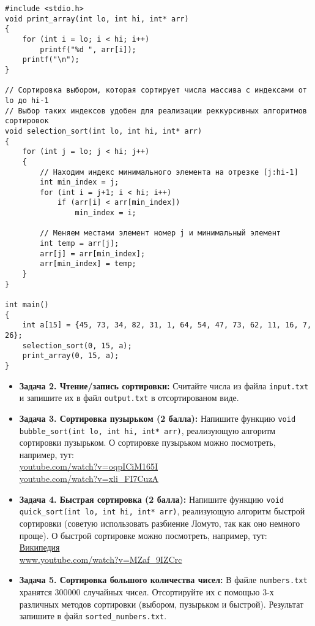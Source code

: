 \documentclass{article}
\begin{document}
\begin{lstlisting}
#include <stdio.h>
void print_array(int lo, int hi, int* arr)
{
	for (int i = lo; i < hi; i++)
		printf("%d ", arr[i]);
	printf("\n");	
}

// Сортировка выбором, которая сортирует числа массива с индексами от lo до hi-1
// Выбор таких индексов удобен для реализации реккурсивных алгоритмов сортировок
void selection_sort(int lo, int hi, int* arr)
{
	for (int j = lo; j < hi; j++)
	{
		// Находим индекс минимального элемента на отрезке [j:hi-1]
		int min_index = j;
		for (int i = j+1; i < hi; i++)
			if (arr[i] < arr[min_index])
				min_index = i;
		
		// Меняем местами элемент номер j и минимальный элемент
		int temp = arr[j];
		arr[j] = arr[min_index];
		arr[min_index] = temp;
	}
}

int main()
{
	int a[15] = {45, 73, 34, 82, 31, 1, 64, 54, 47, 73, 62, 11, 16, 7, 26};
	selection_sort(0, 15, a);
	print_array(0, 15, a);
}
\end{lstlisting}
\begin{itemize}
\item \textbf{Задача 2. Чтение/запись сортировки:} Считайте числа из файла \texttt{input.txt} и запишите их в файл \texttt{output.txt} в отсортированом виде.
\item \textbf{Задача 3. Сортировка пузырьком (2 балла):} Напишите функцию \texttt{void bubble\_sort(int lo, int hi, int* arr)}, реализующую алгоритм сортировки пузырьком. О сортировке пузырьком можно посмотреть, например, тут:\\
\href{https://www.youtube.com/watch?v=oqpICiM165I}{youtube.com/watch?v=oqpICiM165I} \\
\href{https://www.youtube.com/watch?v=xli_FI7CuzA}{youtube.com/watch?v=xli\_FI7CuzA}

\item \textbf{Задача 4. Быстрая сортировка (2 балла):} Напишите функцию \texttt{void quick\_sort(int lo, int hi, int* arr)}, реализующую алгоритм быстрой сортировки (советую использовать разбиение Ломуто, так как оно немного проще). О быстрой сортировке можно посмотреть, например, тут:\\
\href{https://ru.wikipedia.org/wiki/%D0%91%D1%8B%D1%81%D1%82%D1%80%D0%B0%D1%8F_%D1%81%D0%BE%D1%80%D1%82%D0%B8%D1%80%D0%BE%D0%B2%D0%BA%D0%B0}{Википедия}\\
\href{https://www.youtube.com/watch?v=MZaf_9IZCrc}{www.youtube.com/watch?v=MZaf\_9IZCrc}

\item \textbf{Задача 5. Сортировка большого количества чисел:} В файле \texttt{numbers.txt} хранятся 300000 случайных чисел. Отсортируйте их с помощью 3-х различных методов сортировки (выбором, пузырьком и быстрой). Результат запишите в файл \texttt{sorted\_numbers.txt}.
\end{itemize}
\newpage
\end{document}

